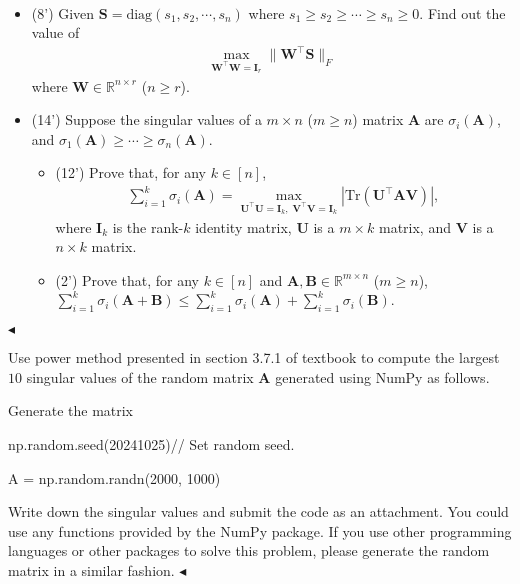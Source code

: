 \documentclass[11pt]{article}
\newenvironment{problem}[2][Problem]{\begin{trivlist}
\item[\hskip \labelsep {\bfseries #1}\hskip \labelsep {\bfseries #2.}]}{\hfill$\blacktriangleleft$\end{trivlist}}
\begin{document}
\begin{problem}{4 (22')}~
\begin{itemize}
    \item [(1)] (8') Given $\bm S=\mathrm{diag}(s_1,s_2,\cdots,s_n)$ where $s_1\geq s_2\geq\cdots\geq s_n\geq 0$. Find out the value of
    \begin{align*}
        \max_{\bm W^\top \bm W =\bm I_r}\|\bm W^\top \bm S\|_F
    \end{align*}
    where $\bm W\in\mathbb{R}^{n\times r}$ ($n\geq r$). 
    \item [(2)] (14') Suppose the singular values of a $m\times n$ ($m\geq n$) matrix $\bm A$ are $\sigma_i(\bm A)$, and $\sigma_1(\bm A)\geq\cdots\geq\sigma_n(\bm A)$.
    \begin{itemize}
        \item [(a)] (12') Prove that, for any $k\in[n]$, 
        \begin{align*}
            \sum_{i=1}^k\sigma_i(\bm A)=\max_{\bm U^\top \bm U=\bm I_k,\;\bm V^\top \bm V=\bm I_k}|\mathrm{Tr}(\bm U^\top \bm A\bm V)|,
        \end{align*}
        where $\bm I_k$ is the rank-$k$ identity matrix, $\bm U$ is a $m\times k$ matrix, and $\bm V$ is a $n\times k$ matrix.
        \item [(b)] (2') Prove that, for any $k\in[n]$ and $\bm A,\bm B\in\mathbb{R}^{m\times n}$ ($m\geq n$), $\sum_{i=1}^k\sigma_i(\bm A+\bm B)\leq\sum_{i=1}^k\sigma_i(\bm A)+\sum_{i=1}^k\sigma_i(\bm B)$.
    \end{itemize}
\end{itemize}
\end{problem}


\begin{problem}{5 (5')}
Use power method presented in section 3.7.1 of textbook to compute the largest $10$ singular values of the random matrix $\bm A$ generated using NumPy as follows.

\begin{algorithm}[htbp]
    \caption{Generate the matrix}
    np.random.seed(20241025)\qquad  // Set random seed.

    A = np.random.randn(2000, 1000)
\end{algorithm}

Write down the singular values and submit the code as an attachment. You could use any functions provided by the NumPy package. If you use other programming languages or other packages to solve this problem, please generate the random matrix in a similar fashion.
\end{problem}
\end{document}
